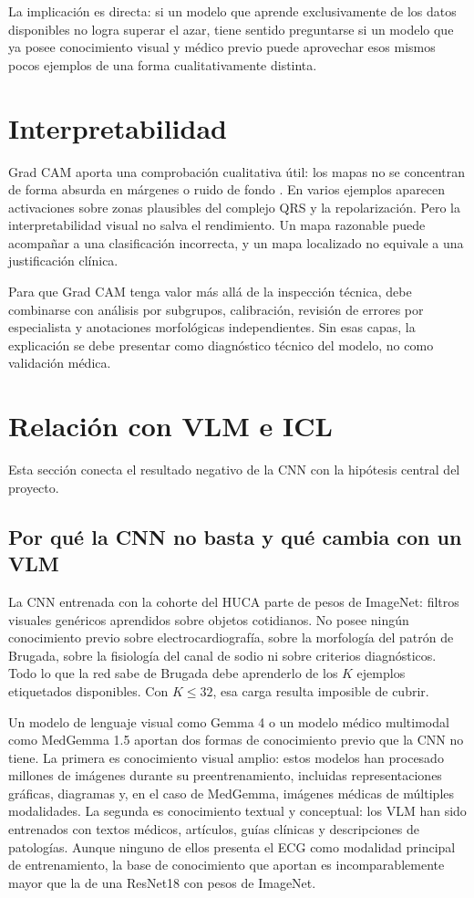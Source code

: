 La implicación es directa: si un modelo que aprende exclusivamente de los datos disponibles no logra superar el azar, tiene sentido preguntarse si un modelo que ya posee conocimiento visual y médico previo puede aprovechar esos mismos pocos ejemplos de una forma cualitativamente distinta.

\section{Interpretabilidad}

Grad CAM aporta una comprobación cualitativa útil: los mapas no se concentran de forma absurda en márgenes o ruido de fondo \cite{selvaraju2017}. En varios ejemplos aparecen activaciones sobre zonas plausibles del complejo QRS y la repolarización. Pero la interpretabilidad visual no salva el rendimiento. Un mapa razonable puede acompañar a una clasificación incorrecta, y un mapa localizado no equivale a una justificación clínica.

Para que Grad CAM tenga valor más allá de la inspección técnica, debe combinarse con análisis por subgrupos, calibración, revisión de errores por especialista y anotaciones morfológicas independientes. Sin esas capas, la explicación se debe presentar como diagnóstico técnico del modelo, no como validación médica.

\section{Relación con VLM e ICL}

Esta sección conecta el resultado negativo de la CNN con la hipótesis central del proyecto.

\subsection{Por qué la CNN no basta y qué cambia con un VLM}

La CNN entrenada con la cohorte del HUCA parte de pesos de ImageNet: filtros visuales genéricos aprendidos sobre objetos cotidianos. No posee ningún conocimiento previo sobre electrocardiografía, sobre la morfología del patrón de Brugada, sobre la fisiología del canal de sodio ni sobre criterios diagnósticos. Todo lo que la red sabe de Brugada debe aprenderlo de los \(K\) ejemplos etiquetados disponibles. Con \(K \leq 32\), esa carga resulta imposible de cubrir.

Un modelo de lenguaje visual como Gemma 4 \cite{gemma4card} o un modelo médico multimodal como MedGemma 1.5 \cite{medgemma15} aportan dos formas de conocimiento previo que la CNN no tiene. La primera es conocimiento visual amplio: estos modelos han procesado millones de imágenes durante su preentrenamiento, incluidas representaciones gráficas, diagramas y, en el caso de MedGemma, imágenes médicas de múltiples modalidades. La segunda es conocimiento textual y conceptual: los VLM han sido entrenados con textos médicos, artículos, guías clínicas y descripciones de patologías. Aunque ninguno de ellos presenta el ECG como modalidad principal de entrenamiento, la base de conocimiento que aportan es incomparablemente mayor que la de una ResNet18 con pesos de ImageNet.

